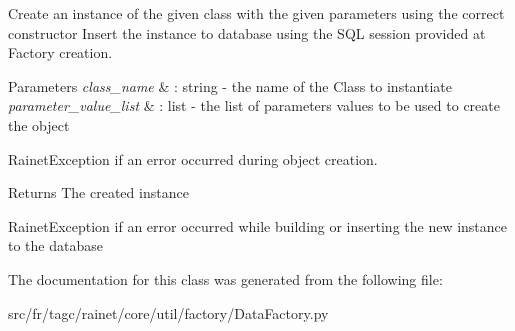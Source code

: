 Create an instance of the given class with the given parameters using the correct constructor Insert the instance to database using the S\-Q\-L session provided at Factory creation. 


\begin{DoxyParams}{Parameters}
{\em class\-\_\-name} & \-: string -\/ the name of the Class to instantiate \\
\hline
{\em parameter\-\_\-value\-\_\-list} & \-: list -\/ the list of parameters values to be used to create the object\\
\hline
\end{DoxyParams}
Rainet\-Exception if an error occurred during object creation.

\begin{DoxyReturn}{Returns}
The created instance
\end{DoxyReturn}
Rainet\-Exception if an error occurred while building or inserting the new instance to the database 

The documentation for this class was generated from the following file\-:\begin{DoxyCompactItemize}
\item 
src/fr/tagc/rainet/core/util/factory/Data\-Factory.\-py\end{DoxyCompactItemize}
